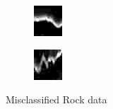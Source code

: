 \documentclass[english, 12pt]{article}
\begin{document}
\begin{figure}[H]
\begin{subfigure}[b]{0.2\textwidth}
        \caption{}
    \end{subfigure}
    \begin{subfigure}[b]{0.2\textwidth}
        \includegraphics[width=\textwidth]{WC13.jpg}
        \caption{}
    \end{subfigure}
    \begin{subfigure}[b]{0.2\textwidth}
        \includegraphics[width=\textwidth]{WC14.jpg}
        \caption{}
    \end{subfigure}
    \caption{Misclassified Rock data}\label{fig:wc1}
\end{figure}
\end{document}
